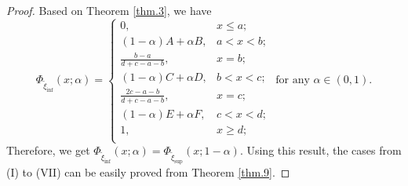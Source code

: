 \begin{proof}
	Based on Theorem \ref{thm.3}, we have 
	\[\Phi_{\tilde{\xi}_{\inf}}(x;\alpha)=\left\{
	\begin{array}{ll}
		0, & x\leq a;\\
		(1-\alpha)A+\alpha B, &  a<x<b;\\
		\frac{b-a}{d+c-a-b}, &  x=b;\\
		(1-\alpha)C+\alpha D, &  b<x<c;\\
		\frac{2c-a-b}{d+c-a-b}, &  x=c;\\
		(1-\alpha)E+\alpha F, &  c<x<d;\\
		1, &  x\geq d;\\
	\end{array}
	\right.
	\text{ for any }\alpha \in (0,1).\] 
	Therefore, we get $\Phi_{\tilde{\xi}_{\inf}}(x;\alpha)=\Phi_{\tilde{\xi}_{\sup}}(x;1-\alpha)$. Using this result, the cases from (I) to (VII) can be easily proved from Theorem \ref{thm.9}.
\end{proof}
